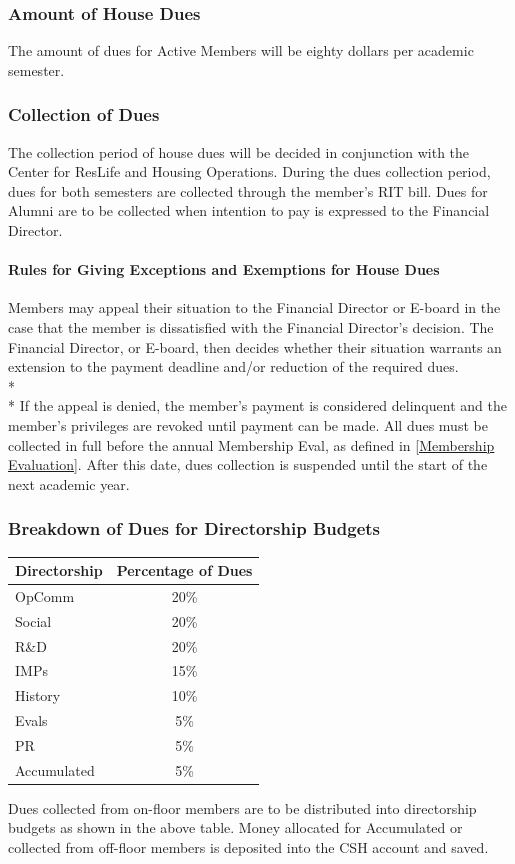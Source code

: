 \documentclass{article}
\newcommand{\asubsection}[1]{\subsubsection{#1} \label{#1}}
\newcommand{\asubsubsection}[1]{\paragraph{#1} \label{#1}}
\begin{document}
\asubsection{Amount of House Dues}
The amount of dues for Active Members will be eighty dollars per academic semester.

\asubsection{Collection of Dues}
The collection period of house dues will be decided in conjunction with the Center for ResLife and Housing Operations.
During the dues collection period, dues for both semesters are collected through the member’s RIT bill.
Dues for Alumni are to be collected when intention to pay is expressed to the Financial Director.

\asubsubsection{Rules for Giving Exceptions and Exemptions for House Dues}
Members may appeal their situation to the Financial Director or E-board in the case that the member is dissatisfied with the Financial Director's decision.
The Financial Director, or E-board, then decides whether their situation warrants an extension to the payment deadline and/or reduction of the required dues.
\\*\\*
If the appeal is denied, the member’s payment is considered delinquent and the member’s privileges are revoked until payment can be made.
All dues must be collected in full before the annual Membership Eval, as defined in \ref{Membership Evaluation}.
After this date, dues collection is suspended until the start of the next academic year.
\asubsection{Breakdown of Dues for Directorship Budgets}
\begin{center}
	\begin{tabular}[c]{|l c|}
		\hline
		Directorship & Percentage of Dues
		\\ \hline
		\hline
		OpComm       & 20\%
		\\ \hline
		Social       & 20\%
		\\ \hline
		R\&D         & 20\%
		\\ \hline
		IMPs         & 15\%
		\\ \hline
		History      & 10\%
		\\ \hline
		Evals        & 5\%
		\\ \hline
		PR           & 5\%
		\\ \hline
		Accumulated  & 5\%
		\\ \hline
	\end{tabular}
\end{center}
Dues collected from on-floor members are to be distributed into directorship budgets as shown in the above table.
Money allocated for Accumulated or collected from off-floor members is deposited into the CSH account and saved.
\end{document}
